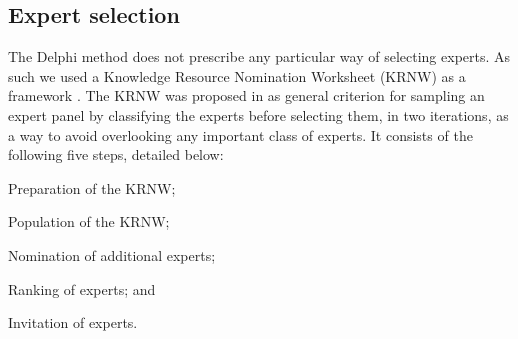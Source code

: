 


\subsection{Expert selection}
\label{sec:expert_selection}
The Delphi method does not prescribe any particular way of selecting experts.
As such we used a Knowledge Resource Nomination Worksheet (KRNW) as a framework \cite{Okoli2004a}. 
The KRNW was proposed in \cite{Delbecq1975} as general criterion for sampling an expert panel by classifying the experts before selecting them, in two iterations, as a way to avoid overlooking any important class of experts.
It consists of the following five steps, detailed below:
\begin{inparaenum}[(1)]
\item \label{step:KRNW1} Preparation of the KRNW;
\item \label{step:KRNW2} Population of the KRNW;
\item \label{step:KRNW3} Nomination of additional experts;
\item \label{step:KRNW4} Ranking of experts; and 
\item \label{step:KRNW5} Invitation of experts.
\end{inparaenum}

